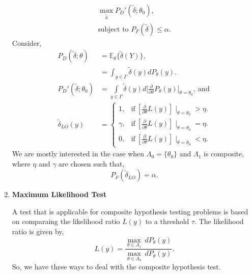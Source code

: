 \documentclass[a4paper,english,12pt]{article}
\begin{document}
\begin{enumerate}
\begin{eqnarray}
\max\limits_{\tilde{\delta}} P_{D}'(\tilde{\delta};\theta_0), \\\nonumber 
\mbox{subject to }P_F(\tilde{\delta}) \leq \alpha.
\end{eqnarray}
Consider,
\begin{align}
P_D(\tilde{ \delta};\theta) &= \mathbb{E}_\theta \{\tilde{ \delta}(Y)\}, \nonumber \\
&= \int_{y \in \Gamma}  \tilde{\delta}(y) dP_\theta(y). \nonumber \\
P_{D}'(\tilde{ \delta};\theta_0) &=  \int\limits_{y \in \Gamma}  \tilde{\delta}(y) d\Bigg[\frac{\partial}{\partial \theta}P_\theta(y)\Bigg]_{\theta = \theta_0},~\mbox{and} \nonumber \\
\tilde{\delta}_{LO}(y) &= 
\begin{cases} 
1, &\mbox{if}~ [\frac{\partial}{\partial \theta}L(y) ] \mid_{\theta = \theta_0} > \eta. \\
\gamma, &\mbox{if}~ [\frac{\partial}{\partial \theta}L(y)] \mid_{\theta = \theta_0} = \eta. \\
0, &\mbox{if}~ [\frac{\partial}{\partial \theta}L(y) ] \mid_{\theta = \theta_0} < \eta.
\end{cases}
\end{align}
We are mostly interested in the case when $\Lambda_0 = \{\theta_0\}$ and $\Lambda_1$ is composite, where $\eta$ and $\gamma$ are chosen such that, 
\begin{equation*}
P_F(\tilde{\delta}_{LO}) = \alpha.
\end{equation*}
\item \textbf{Maximum Likelihood Test}
\par A test that is applicable for composite hypothesis testing problems is based on comparaing the likelihood ratio $ L(y)$ to a threshold $\tau$. The likelihood ratio is given by,
\begin{equation}
L(y)=\dfrac{\max\limits_{\theta \in \Lambda_1} ~ dP_\theta(y)}{\max\limits_{\theta \in \Lambda_0} ~ dP_\theta(y)}. 
\end{equation}
So, we have three ways to deal with the composite hypothesis test.
\end{enumerate}
\end{document}

